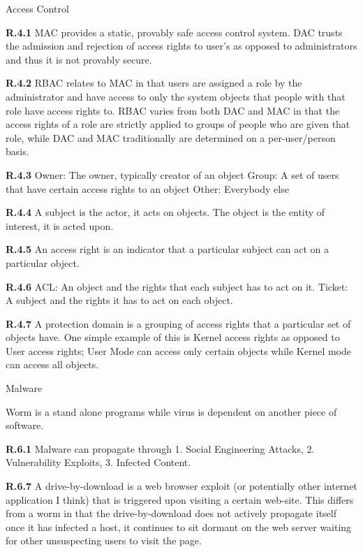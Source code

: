 \documentclass[8pt]{extreport}
\begin{document}
{\Huge Access Control}

{\bf R.4.1} MAC provides a static, provably safe access control system. DAC
trusts the admission and rejection of access rights to user's as opposed to
administrators and thus it is not provably secure.

{\bf R.4.2} RBAC relates to MAC in that users are assigned a role by the
administrator and have access to only the system objects that people with that
role have access rights to. RBAC varies from both DAC and MAC in that the access
rights of a role are strictly applied to groups of people who are given that
role, while DAC and MAC traditionally are determined on a per-user/person basis.

{\bf R.4.3} 
Owner: The owner, typically creator of an object
Group: A set of users that have certain access rights to an object
Other: Everybody else

{\bf R.4.4} A subject is the actor, it acts on objects. The object is the entity
of interest, it is acted upon.

{\bf R.4.5} An access right is an indicator that a particular subject can act on
a particular object.

{\bf R.4.6}
ACL: An object and the rights that each subject has to act on it.
Ticket: A subject and the rights it has to act on each object.

{\bf R.4.7}
A protection domain is a grouping of access rights that a particular set of
objects have. One simple example of this is Kernel access rights as opposed to
User access rights; User Mode can access only certain objects while Kernel mode
can access all objects.


{\Huge Malware}

Worm is a stand alone programs while virus is dependent on another piece of
software.

{\bf R.6.1} Malware can propagate through 
1. Social Engineering Attacks, 
2. Vulnerability Exploits, 
3. Infected Content.

{\bf R.6.7} A drive-by-download is a web browser exploit (or potentially other
internet application I think) that is triggered upon visiting a certain
web-site. This differs from a worm in that the drive-by-download does not
actively propagate itself once it has infected a host, it continues to sit
dormant on the web server waiting for other unsuspecting users to visit the
page.
\end{document}
